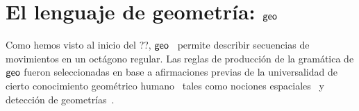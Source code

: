 \section{El lenguaje de geometría: ${\sf geo}$}


Como hemos visto al inicio del ??, ${\sf geo}$~\cite{amalric2017language} permite describir secuencias de movimientos en un octágono regular. Las reglas de producción de la gramática de ${\sf geo}$ fueron seleccionadas en base a afirmaciones previas de la universalidad de cierto conocimiento geométrico humano~\cite{izard2011geometry,dehaene2006core,dillon2013core} tales como nociones espaciales~\cite{landau1981spatial,lee2012navigation} y detección de geometrías~\cite{westphal2012production,machilsen2009role}.


